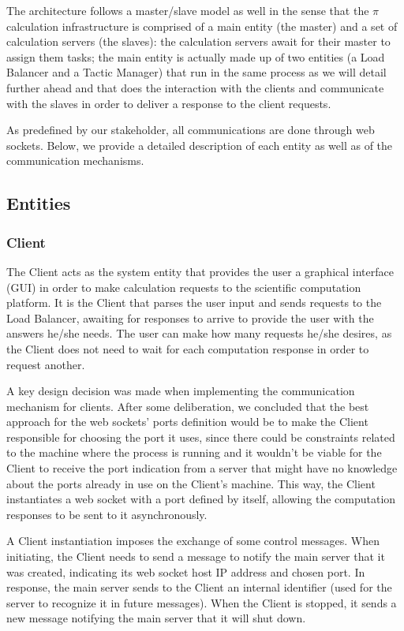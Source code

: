 \documentclass[12pt]{article}
\begin{document}
The architecture follows a master/slave model as well in the sense that the $\pi$ calculation infrastructure is comprised of a main entity (the master) and a 
set of calculation servers (the slaves): the calculation servers await for their master to assign them tasks; the main entity is actually made up of two 
entities (a Load Balancer and a Tactic Manager) that run in the same process as we will detail further ahead and that does the interaction with the clients and 
communicate with the slaves in order to deliver a response to the client requests.

As predefined by our stakeholder, all communications are done through web sockets.
Below, we provide a detailed description of each entity as well as of the communication mechanisms.

\subsection{Entities} \label{entities} %

\subsubsection{Client}

The Client acts as the system entity that provides the user a graphical interface (GUI) in order to make calculation requests to the scientific computation 
platform.
It is the Client that parses the user input and sends requests to the Load Balancer, awaiting for responses to arrive to provide the user with the answers he/she needs.
The user can make how many requests he/she desires, as the Client does not need to wait for each computation response in order to request another.

A key design decision was made when implementing the communication mechanism for clients.
After some deliberation, we concluded that the best approach for the web sockets' ports definition would be to make the Client responsible for choosing the port
it uses, since there could be constraints related to the machine where the process is running and it wouldn't be viable for the Client to receive the port 
indication from a server that might have no knowledge about the ports already in use on the Client's machine. 
This way, the Client instantiates a web socket with a port defined by itself, allowing the computation responses to be sent to it asynchronously.

A Client instantiation imposes the exchange of some control messages.
When initiating, the Client needs to send a message to notify the main server that it was created, indicating its web socket host IP address and chosen port.
In response, the main server sends to the Client an internal identifier (used for the server to recognize it in future messages).
When the Client is stopped, it sends a new message notifying the main server that it will shut down. 
\end{document}

